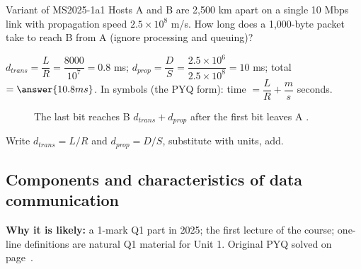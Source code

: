 \begin{question}{Variant of MS2025-1a}{1}
Hosts A and B are 2,500 km apart on a single 10 Mbps link with propagation speed $2.5\times10^{8}$ m/s. How long does a 1,000-byte packet take to reach B from A (ignore processing and queuing)?
\end{question}
\begin{solution}
$d_{trans}=\dfrac{L}{R}=\dfrac{8000}{10^{7}}=0.8$ ms; \quad $d_{prop}=\dfrac{D}{S}=\dfrac{2.5\times10^{6}}{2.5\times10^{8}}=10$ ms; \quad total $=\answer{10.8 ms}$.
In symbols (the PYQ form): time $=\dfrac{L}{R}+\dfrac{m}{s}$ seconds.
\end{solution}
\begin{figure}[H]\centering
{}
\caption{The last bit reaches B $d_{trans}+d_{prop}$ after the first bit leaves A .}\end{figure}
\begin{answerplan}[1 mark]
Write $d_{trans}=L/R$ and $d_{prop}=D/S$, substitute with units, add.
\end{answerplan}

\subsection{Components and characteristics of data communication}\label{iq:C04}
    

\textbf{Why it is likely:} a 1-mark Q1 part in 2025; the first lecture of the course; one-line definitions are natural Q1 material for Unit 1. Original PYQ solved on page~\pageref{q:MS2025-1c}.

